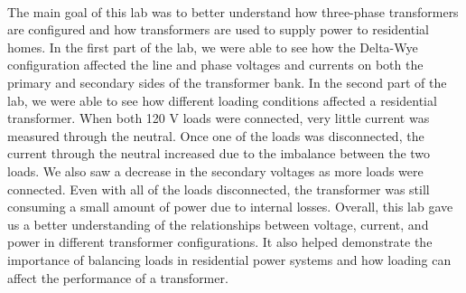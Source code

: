 \paragraph{}The main goal of this lab was to better understand how three-phase transformers are configured and how transformers are used to supply power to residential homes. In the first part of the lab, we were able to see how the Delta-Wye configuration affected the line and phase voltages and currents on both the primary and secondary sides of the transformer bank.
In the second part of the lab, we were able to see how different loading conditions affected a residential transformer. When both 120 V loads were connected, very little current was measured through the neutral. Once one of the loads was disconnected, the current through the neutral increased due to the imbalance between the two loads. We also saw a decrease in the secondary voltages as more loads were connected. Even with all of the loads disconnected, the transformer was still consuming a small amount of power due to internal losses.
Overall, this lab gave us a better understanding of the relationships between voltage, current, and power in different transformer configurations. It also helped demonstrate the importance of balancing loads in residential power systems and how loading can affect the performance of a transformer.

